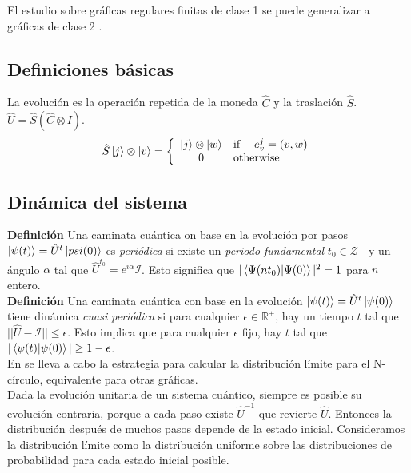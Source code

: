 El estudio sobre gráficas regulares finitas de clase 1 se puede generalizar a gráficas de clase 2 \cite{portugal2013quantum}.

\subsection{Definiciones básicas}

La evolución es la operación repetida de la moneda $\hat{C}$ y la traslación $\hat{S}$.
$\hat{U}=\hat{S}(\hat{C}\otimes I)$.
\begin{equation*}{}
\hat{S}\ket{j}\otimes\ket{v}=
    \left\{
    \begin{array}{cl}
    \ket{j}\otimes\ket{w}    & \text{if}\,\;\;\;\;e^j_v=(v,w) \\
    0  & \text{otherwise}
    \end{array}{}
    \right.
\end{equation*}{}
\subsection{Dinámica del sistema}

\noindent\textbf{Definición} Una caminata cuántica on base en la evolucíón por pasos $\ket{\psi(t)}=\hat{U}^t\ket{psi(0)}$ es \textit{periódica} si existe un \textit{periodo fundamental} $t_0\in\mathcal{Z}^+$ y un ángulo $\alpha$ tal que $\hat{U}^{t_0}=e^{i\alpha}\mathcal{I}$. Esto significa que $|\braket{\Psi(nt_0)|\Psi(0)}|^2=1$ para $n$ entero.\\

\noindent\textbf{Definición} Una caminata cuántica con base en la evolución $\ket{\psi(t)}=\hat{U}^t\ket{\psi(0)}$ tiene dinámica \textit{cuasi periódica} si para cualquier $\epsilon\in\mathbb{R}^+$, hay un tiempo $t$ tal que $||\hat{U}-\mathcal{I}||\leq\epsilon$.
Esto implica que para cualquier $\epsilon$ fijo, hay $t$ tal que $|\braket{\psi(t)|\psi(0)}|\geq1-\epsilon$.\\
En \cite{aharonov2001quantum} se lleva a cabo la estrategia para calcular la distribución límite para el N-círculo, equivalente para otras gráficas.\\
Dada la evolución unitaria de un sistema cuántico, siempre es posible su evolución contraria, porque a cada paso existe $\hat{U}^{-1}$ que revierte $\hat{U}$. Entonces la distribución después de muchos pasos depende de la estado inicial. Consideramos la distribución límite como la distribución uniforme sobre las distribuciones de probabilidad para cada estado inicial posible.\\

